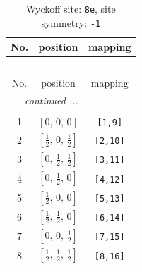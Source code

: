 \documentclass[fleqn,8pt]{jsarticle}
\begin{document}
\renewcommand{\arraystretch}{1.2}
\begin{longtable}{ccc}
\caption{Wyckoff site: {\tt 8e}, site symmetry: {\tt -1}}
 \\
 \hline \hline
No. & position & mapping \\ \hline \endfirsthead

\multicolumn{2}{l}{\tablename\ \thetable{}} \\
 \hline \hline
No. & position & mapping \\ \hline \endhead

 \hline \hline
\multicolumn{2}{r}{\footnotesize\it continued ...} \\ \endfoot

 \hline \hline
\multicolumn{2}{r}{} \\ \endlastfoot

1 & $\left[ 0,\, 0,\, 0 \right]$ & {\tt [1,9]} \\ \hline
2 & $\left[ \frac{1}{2},\, 0,\, \frac{1}{2} \right]$ & {\tt [2,10]} \\ \hline
3 & $\left[ 0,\, \frac{1}{2},\, \frac{1}{2} \right]$ & {\tt [3,11]} \\ \hline
4 & $\left[ 0,\, \frac{1}{2},\, 0 \right]$ & {\tt [4,12]} \\ \hline
5 & $\left[ \frac{1}{2},\, 0,\, 0 \right]$ & {\tt [5,13]} \\ \hline
6 & $\left[ \frac{1}{2},\, \frac{1}{2},\, 0 \right]$ & {\tt [6,14]} \\ \hline
7 & $\left[ 0,\, 0,\, \frac{1}{2} \right]$ & {\tt [7,15]} \\ \hline
8 & $\left[ \frac{1}{2},\, \frac{1}{2},\, \frac{1}{2} \right]$ & {\tt [8,16]} \\
\end{longtable}
\renewcommand{\arraystretch}{1.2}
\end{document}
